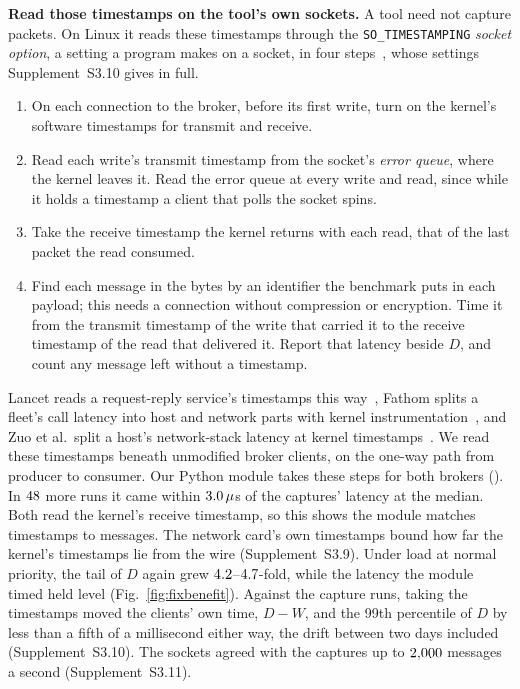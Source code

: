 \documentclass[10pt,journal,compsoc]{IEEEtran}
\begin{document}
\textbf{Read those timestamps on the tool's own sockets.} A tool need not capture packets. On
Linux it reads these timestamps through the \texttt{SO\_TIMESTAMPING} \emph{socket option},
a setting a program makes on a socket, in four steps~\cite{linux_timestamping}, whose settings Supplement~S3.10 gives in full. \begin{enumerate} \item On each connection to the broker, before its first write, turn on the kernel's software timestamps for transmit and receive. \item Read each write's transmit timestamp from the socket's \emph{error queue}, where the kernel leaves it. Read the error queue at every write and read, since while it holds a timestamp a client that polls the socket spins.
\item Take the receive timestamp the kernel returns with each read, that of the last packet the
read consumed.
\item Find each message in the bytes by an identifier the benchmark puts in each payload; this
needs a connection without compression or encryption. Time it from the transmit timestamp of the write
that carried it to the receive timestamp of the read that delivered it. Report that latency beside
$D$, and count any message left without a timestamp.
\end{enumerate}
Lancet reads a request-reply service's timestamps this way~\cite{kogias2019lancet}, Fathom
splits a fleet's call latency into host and network parts with kernel
instrumentation~\cite{qureshi2023fathom}, and Zuo et al.\ split a host's network-stack latency at
kernel timestamps~\cite{zuo2026hoststack}. We read these timestamps beneath unmodified broker
clients, on the one-way path from producer to consumer. Our Python module takes these steps for
both brokers (). In $48$ more runs it came
within $3.0\,\mu$s of the captures' latency at the median. Both read the kernel's
receive timestamp, so this shows the module matches timestamps to messages. The network card's own timestamps bound how far the kernel's timestamps lie from the wire (Supplement~S3.9). Under load at
normal priority, the tail of $D$ again grew $4.2$--$4.7$-fold, while
the latency the module timed held level (Fig.~\ref{fig:fixbenefit}).  Against the
capture runs, taking the timestamps moved the clients' own time, $D - W$, and the 99th percentile of $D$ by less than a fifth of a millisecond either way, the drift between two days included (Supplement~S3.10). The sockets agreed with the captures up to $2{,}000$ messages a second (Supplement~S3.11).
\end{document}
